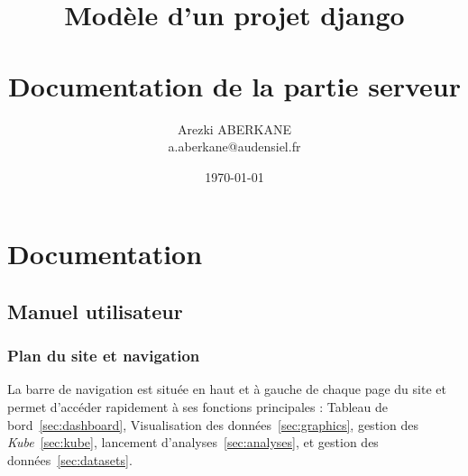 \documentclass[a4paper]{report}
\title{\huge{Modèle d'un projet django}\\~\\
	Documentation de la partie serveur}
\author{Arezki ABERKANE\\a.aberkane@audensiel.fr}
\date{\today}
\begin{document}
	\maketitle
	\tableofcontents
\newpage
	
	


	
\part{Documentation}

\chapter{Manuel utilisateur}
\label{chap:manual}


\section{Plan du site et navigation}

La barre de navigation est située en haut et à gauche de chaque page du site et permet d'accéder rapidement à ses fonctions principales : Tableau de bord~\ref{sec:dashboard}, Visualisation des données~\ref{sec:graphics}, gestion des \emph{Kube}~\ref{sec:kube}, lancement d'analyses~\ref{sec:analyses}, et gestion des données~\ref{sec:datasets}.\\
\end{document}
